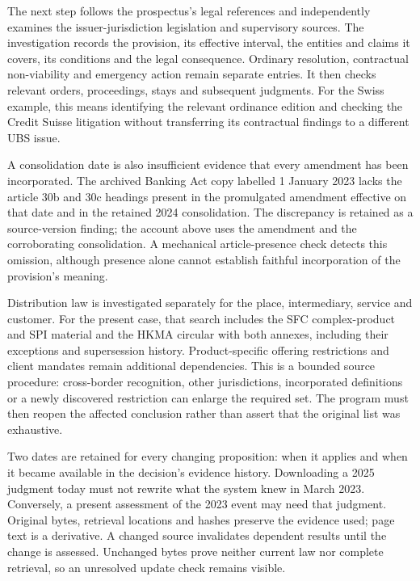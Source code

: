 \documentclass[12pt,a4paper,oneside,openany]{book}
\begin{document}
The next step follows the prospectus's legal references and independently
examines the issuer-jurisdiction legislation and supervisory sources. The
investigation records the provision, its effective interval, the entities and
claims it covers, its conditions and the legal consequence. Ordinary resolution,
contractual non-viability and emergency action remain separate entries. It then
checks relevant orders, proceedings, stays and subsequent judgments. For the
Swiss example, this means identifying the relevant ordinance edition and
checking the Credit Suisse litigation without transferring its contractual
findings to a different UBS issue.

A consolidation date is also insufficient evidence that every amendment has
been incorporated. The archived Banking Act copy labelled 1 January 2023 lacks
the article 30b and 30c headings present in the promulgated amendment effective
on that date and in the retained 2024 consolidation. The discrepancy is retained
as a source-version finding; the account above uses the amendment and the
corroborating consolidation. A mechanical article-presence check detects this
omission, although presence alone cannot establish faithful incorporation of
the provision's meaning.

Distribution law is investigated separately for the place, intermediary,
service and customer. For the present case, that search includes the SFC
complex-product and SPI material and the HKMA circular with both annexes,
including their exceptions and supersession history. Product-specific offering
restrictions and client mandates remain additional dependencies. This is a
bounded source procedure: cross-border recognition, other jurisdictions,
incorporated definitions or a newly discovered restriction can enlarge the
required set. The program must then reopen the affected conclusion rather than
assert that the original list was exhaustive.

Two dates are retained for every changing proposition: when it applies and
when it became available in the decision's evidence history. Downloading a
2025 judgment today must not rewrite what the system knew in March 2023.
Conversely, a present assessment of the 2023 event may need that judgment.
Original bytes, retrieval locations and hashes preserve the evidence used;
page text is a derivative. A changed source invalidates dependent results until
the change is assessed. Unchanged bytes prove neither current law nor complete
retrieval, so an unresolved update check remains visible.
\end{document}
